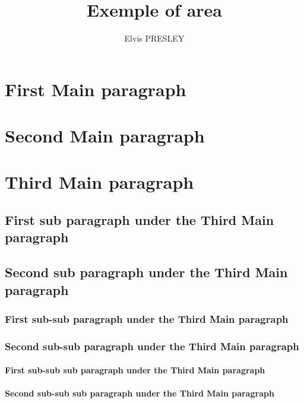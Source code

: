 \documentclass{vijreport}
\begin{document}
	\title{Exemple of area}
	\author{Elvis PRESLEY}
	\maketitle
	\tableofcontents
	\section{First Main paragraph}
	\section{Second Main paragraph}
	\section{Third Main paragraph}
	\subsection{First sub paragraph under the Third Main paragraph}
	\subsection{Second sub paragraph under the Third Main paragraph}
	\subsubsection{First sub-sub paragraph under the Third Main
	paragraph}
	\subsubsection{Second sub-sub paragraph under the Third Main
	paragraph}
	\paragraph{First sub-sub sub paragraph under the Third Main
	paragraph}
	\paragraph{Second sub-sub sub paragraph under the Third Main
	paragraph}
\end{document}

